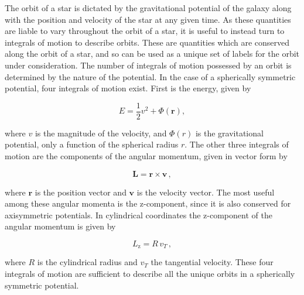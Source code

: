 The orbit of a star is dictated by the gravitational potential of the galaxy along with the position and velocity of the star at any given time. As these quantities are liable to vary throughout the orbit of a star, it is useful to instead turn to integrals of motion to describe orbits. These are quantities which are conserved along the orbit of a star, and so can be used as a unique set of labels for the orbit under consideration. The number of integrals of motion possessed by an orbit is determined by the nature of the potential. In the case of a spherically symmetric potential, four integrals of motion exist. First is the energy, given by 

\begin{equation}
    \label{ch1:eq:energy}
    E = \frac{1}{2}v^2 + \Phi(\mathbf{r}),
\end{equation}

\noindent where $v$ is the magnitude of the velocity, and $\Phi(r)$ is the gravitational potential, only a function of the spherical radius $r$. The other three integrals of motion are the components of the angular momentum, given in vector form by

\begin{equation}
    \label{ch1:eq:angular-momentum}
    \mathbf{L} = \mathbf{r} \times \mathbf{v}\,,
\end{equation}

\noindent where $\mathbf{r}$ is the position vector and $\mathbf{v}$ is the velocity vector. The most useful among these angular momenta is the z-component, since it is also conserved for axisymmetric potentials. In cylindrical coordinates the z-component of the angular momentum is given by

\begin{equation}
    \label{ch1:eq:z-angular-momentum}
    L_\mathrm{z} = R \, v_{T}\,,
\end{equation}

\noindent where $R$ is the cylindrical radius and $v_{T}$ the tangential velocity. These four integrals of motion are sufficient to describe all the unique orbits in a spherically symmetric potential.


